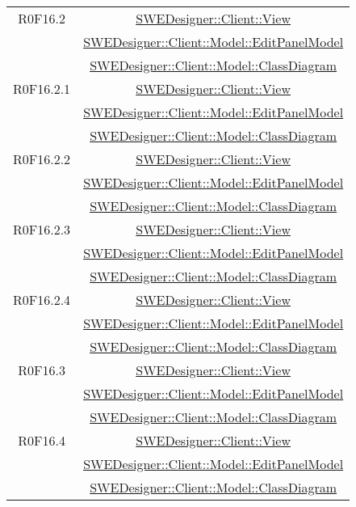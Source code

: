 \documentclass[../SpecificaTecnica.tex]{subfiles}
\begin{document}
\begin{longtable}{|c|c|}
		R0F16.2 & \hyperlink{SWEDesigner::Client::View}{SWEDesigner::Client::View} \\& \hyperlink{SWEDesigner::Client::Model::EditPanelModel}{SWEDesigner::Client::Model::EditPanelModel} \\& \hyperlink{SWEDesigner::Client::Model::ClassDiagram}{SWEDesigner::Client::Model::ClassDiagram}\\\hline
		R0F16.2.1 & \hyperlink{SWEDesigner::Client::View}{SWEDesigner::Client::View} \\& \hyperlink{SWEDesigner::Client::Model::EditPanelModel}{SWEDesigner::Client::Model::EditPanelModel} \\& \hyperlink{SWEDesigner::Client::Model::ClassDiagram}{SWEDesigner::Client::Model::ClassDiagram}\\\hline
		R0F16.2.2 & \hyperlink{SWEDesigner::Client::View}{SWEDesigner::Client::View} \\& \hyperlink{SWEDesigner::Client::Model::EditPanelModel}{SWEDesigner::Client::Model::EditPanelModel} \\& \hyperlink{SWEDesigner::Client::Model::ClassDiagram}{SWEDesigner::Client::Model::ClassDiagram}\\\hline
		R0F16.2.3 & \hyperlink{SWEDesigner::Client::View}{SWEDesigner::Client::View} \\& \hyperlink{SWEDesigner::Client::Model::EditPanelModel}{SWEDesigner::Client::Model::EditPanelModel} \\& \hyperlink{SWEDesigner::Client::Model::ClassDiagram}{SWEDesigner::Client::Model::ClassDiagram}\\\hline
		R0F16.2.4 & \hyperlink{SWEDesigner::Client::View}{SWEDesigner::Client::View} \\& \hyperlink{SWEDesigner::Client::Model::EditPanelModel}{SWEDesigner::Client::Model::EditPanelModel} \\& \hyperlink{SWEDesigner::Client::Model::ClassDiagram}{SWEDesigner::Client::Model::ClassDiagram}\\\hline
		R0F16.3 & \hyperlink{SWEDesigner::Client::View}{SWEDesigner::Client::View} \\& \hyperlink{SWEDesigner::Client::Model::EditPanelModel}{SWEDesigner::Client::Model::EditPanelModel} \\& \hyperlink{SWEDesigner::Client::Model::ClassDiagram}{SWEDesigner::Client::Model::ClassDiagram}\\\hline
		R0F16.4 & \hyperlink{SWEDesigner::Client::View}{SWEDesigner::Client::View} \\& \hyperlink{SWEDesigner::Client::Model::EditPanelModel}{SWEDesigner::Client::Model::EditPanelModel} \\& \hyperlink{SWEDesigner::Client::Model::ClassDiagram}{SWEDesigner::Client::Model::ClassDiagram}\\\hline

\end{longtable}
\end{document}
